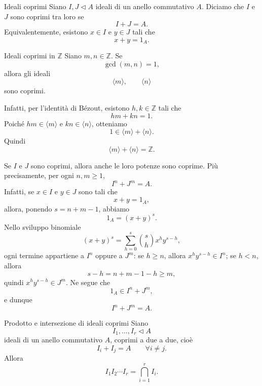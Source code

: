 \documentclass[a4paper]{article}
\begin{document}
\begin{radioactive}
\begin{snippetdefinition}{Ideali coprimi}
    Siano \(I,J\triangleleft A\) ideali di un anello commutativo \(A\).
    Diciamo che \(I\) e \(J\) sono coprimi tra loro se
    \[
        I+J=A.
    \]
    Equivalentemente, esistono \(x\in I\) e \(y\in J\) tali che
    \[
        x+y=1_A.
    \]
\end{snippetdefinition}
\end{radioactive}

\begin{radioactive}
\begin{snippetexample}{Ideali coprimi in \(\mathbb{Z}\)}
    Siano \(m,n\in\mathbb{Z}\). Se
    \[
        \gcd(m,n)=1,
    \]
    allora gli ideali
    \[
        \langle m \rangle,
        \qquad
        \langle n \rangle
    \]
    sono coprimi.

    Infatti, per l'identità di Bézout, esistono \(h,k\in\mathbb{Z}\) tali che
    \[
        hm+kn=1.
    \]
    Poiché \(hm\in\langle m \rangle\) e \(kn\in\langle n \rangle\), otteniamo
    \[
        1\in\langle m \rangle+\langle n \rangle.
    \]
    Quindi
    \[
        \langle m \rangle+\langle n \rangle=\mathbb{Z}.
    \]
\end{snippetexample}
\end{radioactive}

\begin{radioactive}
Se \(I\) e \(J\) sono coprimi, allora anche le loro potenze sono coprime. Più precisamente, per ogni \(n,m\geq 1\),
\[
    I^n+J^m=A.
\]
Infatti, se \(x\in I\) e \(y\in J\) sono tali che
\[
    x+y=1_A,
\]
allora, ponendo \(s=n+m-1\), abbiamo
\[
    1_A=(x+y)^s.
\]
Nello sviluppo binomiale
\[
    (x+y)^s
    =
    \sum_{h=0}^{s}
    \binom{s}{h}x^hy^{s-h},
\]
ogni termine appartiene a \(I^n\) oppure a \(J^m\): se \(h\geq n\), allora \(x^hy^{s-h}\in I^n\); se \(h<n\), allora
\[
    s-h=n+m-1-h\geq m,
\]
quindi \(x^hy^{s-h}\in J^m\). Ne segue che
\[
    1_A\in I^n+J^m,
\]
e dunque
\[
    I^n+J^m=A.
\]
\end{radioactive}

\begin{radioactive}
\begin{snippetproposition}{Prodotto e intersezione di ideali coprimi}
    Siano
    \[
        I_1,\ldots,I_r\triangleleft A
    \]
    ideali di un anello commutativo \(A\), coprimi a due a due, cioè
    \[
        I_i+I_j=A
        \qquad
        \forall i\neq j.
    \]
    Allora
    \[
        I_1I_2\cdots I_r
        =
        \bigcap_{i=1}^r I_i.
    \]
\end{snippetproposition}
\end{radioactive}
\end{document}
